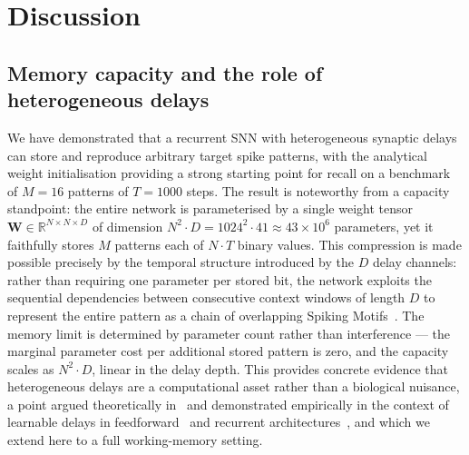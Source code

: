\documentclass{scrartcl}
\newcommand{\citep}[1]{\parencite{#1}}
\newcommand{\citet}[1]{\textcite{#1}}
\begin{document}
%
\section{Discussion}

\subsection{Memory capacity and the role of heterogeneous delays}

We have demonstrated that a recurrent SNN with heterogeneous synaptic delays can store and reproduce arbitrary target spike patterns, with the analytical weight initialisation providing a strong starting point for recall on a benchmark of $M=16$ patterns of $T=1000$ steps. The result is noteworthy from a capacity standpoint: the entire network is parameterised by a single weight tensor $\mathbf{W} \in \mathbb{R}^{N \times N \times D}$ of dimension $N^2 \cdot D = 1024^2 \cdot 41 \approx 43 \times 10^6$ parameters, yet it faithfully stores $M$ patterns each of $N \cdot T$ binary values. This compression is made possible precisely by the temporal structure introduced by the $D$ delay channels: rather than requiring one parameter per stored bit, the network exploits the sequential dependencies between consecutive context windows of length $D$ to represent the entire pattern as a chain of overlapping Spiking Motifs~\citep{Perrinet2023,Kronland-Martinet2026}. The memory limit is determined by parameter count rather than interference --- the marginal parameter cost per additional stored pattern is zero, and the capacity scales as $N^2 \cdot D$, linear in the delay depth. This provides concrete evidence that heterogeneous delays are a computational asset rather than a biological nuisance, a point argued theoretically in~\citet{Izhikevich2006} and demonstrated empirically in the context of learnable delays in feedforward~\citep{Grimaldi2023a,Hammouamri2023} and recurrent architectures~\citep{Queant2025,Meszaros2025}, and which we extend here to a full working-memory setting.
\end{document}
